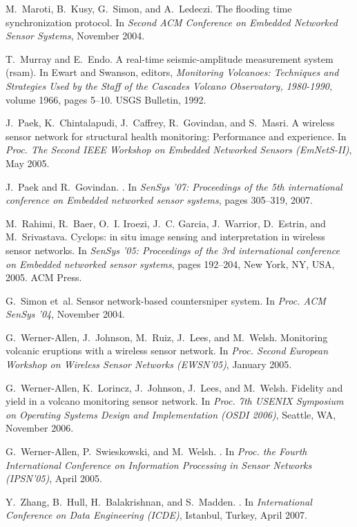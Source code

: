 \documentclass[lettersize]{sig-alternate-konrad}
\begin{document}
\begin{thebibliography}{10}
M.~Maroti, B.~Kusy, G.~Simon, and A.~Ledeczi.
\newblock The flooding time synchronization protocol.
\newblock In {\em Second ACM Conference on Embedded Networked Sensor Systems},
  November 2004.

T.~Murray and E.~Endo.
\newblock A real-time seismic-amplitude measurement system (rsam).
\newblock In Ewart and Swanson, editors, {\em Monitoring Volcanoes: Techniques
  and Strategies Used by the Staff of the Cascades Volcano Observatory,
  1980-1990}, volume 1966, pages 5--10. USGS Bulletin, 1992.

J.~Paek, K.~Chintalapudi, J.~Caffrey, R.~Govindan, and S.~Masri.
\newblock A wireless sensor network for structural health monitoring:
  Performance and experience.
\newblock In {\em Proc. The Second IEEE Workshop on Embedded Networked Sensors
  (EmNetS-II)}, May 2005.

J.~Paek and R.~Govindan.
.
\newblock In {\em SenSys '07: Proceedings of the 5th international conference
  on Embedded networked sensor systems}, pages 305--319, 2007.

M.~Rahimi, R.~Baer, O.~I. Iroezi, J.~C. Garcia, J.~Warrior, D.~Estrin, and
  M.~Srivastava.
\newblock Cyclops: in situ image sensing and interpretation in wireless sensor
  networks.
\newblock In {\em SenSys '05: Proceedings of the 3rd international conference
  on Embedded networked sensor systems}, pages 192--204, New York, NY, USA,
  2005. ACM Press.

G.~Simon et~al.
\newblock Sensor network-based countersniper system.
\newblock In {\em Proc. ACM SenSys '04}, November 2004.

G.~Werner-Allen, J.~Johnson, M.~Ruiz, J.~Lees, and M.~Welsh.
\newblock Monitoring volcanic eruptions with a wireless sensor network.
\newblock In {\em Proc. Second European Workshop on Wireless Sensor Networks
  (EWSN'05)}, January 2005.

G.~Werner-Allen, K.~Lorincz, J.~Johnson, J.~Lees, and M.~Welsh.
\newblock Fidelity and yield in a volcano monitoring sensor network.
\newblock In {\em Proc. 7th USENIX Symposium on Operating Systems Design and
  Implementation (OSDI 2006)}, Seattle, WA, November 2006.

G.~Werner-Allen, P.~Swieskowski, and M.~Welsh.
.
\newblock In {\em Proc. the Fourth International Conference on Information
  Processing in Sensor Networks (IPSN'05)}, April 2005.

Y.~Zhang, B.~Hull, H.~Balakrishnan, and S.~Madden.
.
\newblock In {\em International Conference on Data Engineering (ICDE)},
  Istanbul, Turkey, April 2007.

\end{thebibliography}
\end{document}
